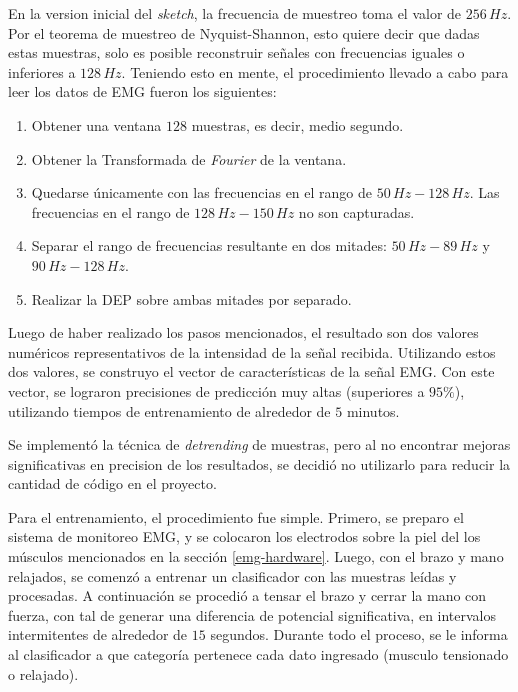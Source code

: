 En la version inicial del \emph{sketch}, la frecuencia de muestreo toma el valor de $256\, Hz$. Por el teorema de muestreo de Nyquist-Shannon, esto quiere decir que dadas estas muestras, solo es posible reconstruir señales con frecuencias iguales o inferiores a $128\, Hz$. Teniendo esto en mente, el procedimiento llevado a cabo para leer los datos de EMG fueron los siguientes:

 \begin{enumerate}
 \item Obtener una ventana $128$ muestras, es decir, medio segundo.
 \item Obtener la Transformada de \emph{Fourier} de la ventana.
 \item Quedarse únicamente con las frecuencias en el rango de $50 \, Hz-128 \, Hz$. Las frecuencias en el rango de $128 \, Hz-150 \, Hz$ no son capturadas.
 \item Separar el rango de frecuencias resultante en dos mitades: $50 \, Hz-89 \, Hz$ y $90 \, Hz-128 \, Hz$.
 \item Realizar la DEP sobre ambas mitades por separado.
 \end{enumerate}

Luego de haber realizado los pasos mencionados, el resultado son dos valores numéricos representativos de la intensidad de la señal recibida.  Utilizando estos dos valores, se construyo el vector de características de la señal EMG. Con este vector, se lograron precisiones de predicción muy altas (superiores a $ 95 \%$), utilizando tiempos de entrenamiento de alrededor de $5$ minutos.

Se implementó la técnica de \emph{detrending} de muestras, pero al no encontrar mejoras significativas en precision de los resultados, se decidió no utilizarlo para reducir la cantidad de código en el proyecto.

Para el entrenamiento, el procedimiento fue simple. Primero, se preparo el sistema de monitoreo EMG, y se colocaron los electrodos sobre la piel del los músculos mencionados en la sección \ref{emg-hardware}. Luego, con el brazo y mano relajados, se comenzó a entrenar un clasificador con las muestras leídas y procesadas. A continuación se procedió a tensar el brazo y cerrar la mano con fuerza, con tal de generar una diferencia de potencial significativa, en intervalos intermitentes de alrededor de $15$ segundos. Durante todo el proceso, se le informa al clasificador a que categoría pertenece cada dato ingresado (musculo tensionado o relajado).

